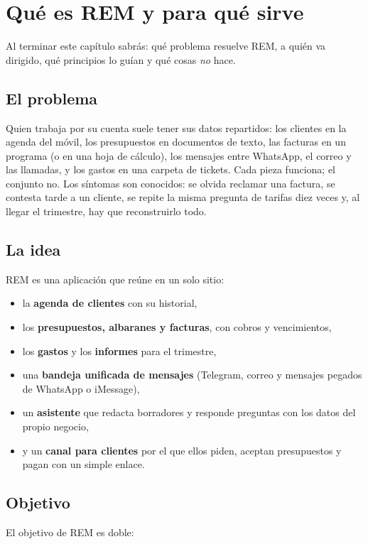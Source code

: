 \chapter{Qué es REM y para qué sirve}\label{cap:que-es}

\begin{objbox}
Al terminar este capítulo sabrás: qué problema resuelve REM, a quién va dirigido, qué principios lo guían y qué cosas \emph{no} hace.
\end{objbox}

\section{El problema}
Quien trabaja por su cuenta suele tener sus datos repartidos: los clientes en la agenda del móvil, los presupuestos en documentos de texto, las facturas en un programa (o en una hoja de cálculo), los mensajes entre WhatsApp, el correo y las llamadas, y los gastos en una carpeta de tickets. Cada pieza funciona; el conjunto no. Los síntomas son conocidos: se olvida reclamar una factura, se contesta tarde a un cliente, se repite la misma pregunta de tarifas diez veces y, al llegar el trimestre, hay que reconstruirlo todo.

\section{La idea}
REM es una aplicación que reúne en un solo sitio:
\begin{itemize}
\item la \textbf{agenda de clientes} con su historial,
\item los \textbf{presupuestos, albaranes y facturas}, con cobros y vencimientos,
\item los \textbf{gastos} y los \textbf{informes} para el trimestre,
\item una \textbf{bandeja unificada de mensajes} (Telegram, correo y mensajes pegados de WhatsApp o iMessage),
\item un \textbf{asistente} que redacta borradores y responde preguntas con los datos del propio negocio,
\item y un \textbf{canal para clientes} por el que ellos piden, aceptan presupuestos y pagan con un simple enlace.
\end{itemize}

\section{Objetivo}
El objetivo de REM es doble:

